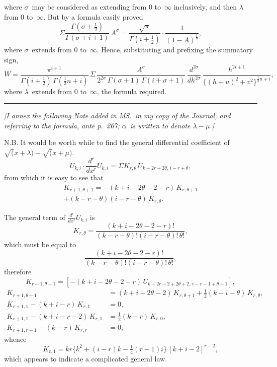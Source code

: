\documentclass[11pt,a4paper]{book}
\begin{document}
where $\sigma$~may be considered as extending from $0$ to~$\infty$ inclusively, and then $\lambda$ from $0$ to~$\infty$. But by a formula easily proved
\[
\Sigma \frac{\Gamma(\sigma+\frac{1}{2})}{\Gamma(\sigma+i+1)} \, A^\sigma = \frac{\sqrt{\pi}}{\Gamma(i+\frac{1}{2})} \cdot \frac{1}{(1-A)^{\frac{1}{2}}},
\]
where $\sigma$~extends from $0$ to~$\infty$. Hence, substituting and prefixing the summatory sign,
\[
W = \frac{\pi^{i+1}}{\Gamma(i+\frac{1}{2})\,\Gamma(\frac{1}{2}n+i)} \, \Sigma \, \frac{A^\sigma}{2^{2\sigma}\,\Gamma(\sigma+1)\,\Gamma(i+\sigma+1)} \, \frac{d^{2\sigma}}{dh^{2\sigma}} \, \frac{h^{2i+1}}{\{(h+u)^2 + v^2\}^{\frac{1}{2}n+i}},
\]
where $\lambda$~extends from $0$ to~$\infty$, the formula required.

\vspace{10pt}
\noindent\rule{\textwidth}{0.4pt}
\vspace{4pt}
\footnotesize
\textit{[I annex the following Note added in MS.\ in my copy of the Journal, and referring to the formula, ante p.~267; $\alpha$~is written to denote $\lambda - \mu$.]}

N.B. It would be worth while to find the general differential coefficient of $\surd(x+\lambda) - \surd(x+\mu)$.
\[
U_{k,i} \cdot \frac{d^r}{dx^r} U_{k,i} = \Sigma K_{r,\theta} \, U_{k-2r+2\theta,\, i-r+\theta},
\]
from which it is easy to see that
\begin{multline*}
K_{r+1,\theta+1} = -(k+i-2\theta-2-r) \, K_{r,\theta+1} \\
+ (k-r-\theta)(i-r-\theta) \, K_{r,\theta}.
\end{multline*}

The general term of $\frac{d^r}{dx^r} U_{k,i}$ is
\[
K_{r,\theta} = \frac{(k+i-2\theta-2-r)!}{(k-r-\theta)!(i-r-\theta)!\,\theta!},
\]
which must be equal to
\[
\frac{(k+i-2\theta-2-r)!}{(k-r-\theta)!(i-r-\theta)!\,\theta!},
\]
therefore
\[
K_{r+1,\theta+1} = [-(k+i-2\theta-2-r)\,U_{k-2r-2+2\theta+2,\,i-r-1+\theta+1}],
\]
\begin{align*}
K_{r+1,\theta+1} &= (k+i-2\theta-2)\,K_{r,\theta+1} + \tfrac{1}{2}(k-i-\theta)\,K_{r,\theta},\\
K_{r+1,1} - (k+i-r)\,K_{r,1} &= 0,\\
K_{r+1,1} - (k+i-r-2)\,K_{r,1} &= \tfrac{1}{2}(k-r)\,K_{r,0},\\
K_{r+1,r+1} - (k-r)\,K_{r,r} &= 0,
\end{align*}
whence
\[
K_{r,1} = kr \{k^2 + (i-r)k - \tfrac{1}{4}(r-1)i\} \, [k+i-2]^{r-2},
\]
which appears to indicate a complicated general law.
\end{document}
